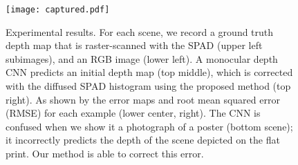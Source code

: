 \begin{figure}[t]
	\centering
	\texttt{[image: captured.pdf]}
	\caption{Experimental results. For each scene, we record a ground truth depth map that is raster-scanned with the SPAD (upper left subimages), and an RGB image (lower left). A monocular depth CNN predicts an initial depth map (top middle), which is corrected with the diffused SPAD histogram using the proposed method (top right). As shown by the error maps and root mean squared error (RMSE) for each example (lower center, right). The CNN is confused when we show it a photograph of a poster (bottom scene); it incorrectly predicts the depth of the scene depicted on the flat print. Our method is able to correct this error. }
	\label{fig:results_captured}
\end{figure}
